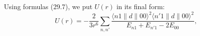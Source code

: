 Using formulas (29.7), we put $U(r)$ in its final form:
\[
U(r)=-\frac2{3r^6}\sum_{n,n'}\frac{\langle n1\|d\|00\rangle^2\langle n'1\|d\|00\rangle^2}{E_{n1}+E_{n'1}-2E_{00}},
\]
